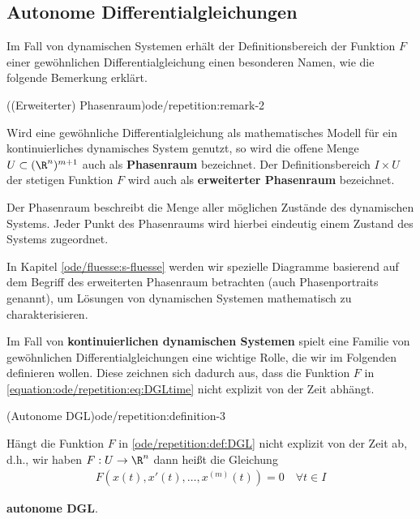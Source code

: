 \documentclass[letterpaper,10pt,german]{jupyterBook}
\begin{document}
\subsection{Autonome Differentialgleichungen}
\label{\detokenize{ode/repetition:autonome-differentialgleichungen}}
\par
Im Fall von dynamischen Systemen erhält der Definitionsbereich der Funktion \(F\) einer gewöhnlichen Differentialgleichung einen besonderen Namen, wie die folgende Bemerkung erklärt.
\begin{remark}{((Erweiterter) Phasenraum)}{ode/repetition:remark-2}



\par
Wird eine gewöhnliche Differentialgleichung als mathematisches Modell für ein kontinuierliches dynamisches System genutzt, so wird die offene Menge \(U\subset (\R^n)^{m+1}\) auch als \textbf{Phasenraum} bezeichnet.
Der Definitionsbereich \(I\times U\) der stetigen Funktion \(F\) wird auch als \textbf{erweiterter Phasenraum} bezeichnet.

\par
Der Phasenraum beschreibt die Menge aller möglichen Zustände des dynamischen Systems.
Jeder Punkt des Phasenraums wird hierbei eindeutig einem Zustand des Systems zugeordnet.

\par
In Kapitel \cref{ode/fluesse:s-fluesse}  werden wir spezielle Diagramme basierend auf dem Begriff des erweiterten Phasenraum betrachten (auch Phasenportraits genannt), um Lösungen von dynamischen Systemen mathematisch zu charakterisieren.
\end{remark}

\par
Im Fall von \textbf{kontinuierlichen dynamischen Systemen} spielt eine Familie von gewöhnlichen Differentialgleichungen eine wichtige Rolle, die wir im Folgenden definieren wollen.
Diese zeichnen sich dadurch aus, dass die Funktion \(F\) in \eqref{equation:ode/repetition:eq:DGLtime} nicht explizit von der Zeit abhängt.
\begin{definition}{(Autonome DGL)}{ode/repetition:definition-3}



\par
Hängt die Funktion \(F\) in \cref{ode/repetition:def:DGL} nicht explizit von der Zeit ab, d.h., wir haben \(F:U\rightarrow\R^n\) dann heißt die Gleichung
\begin{align}\label{equation:ode/repetition:eq:autonomeDGL}
F(x(t), x'(t), \ldots, x^{(m)}(t)) = 0 \quad \forall t\in I
\end{align}
\par
\textbf{autonome DGL}.
\end{definition}
\end{document}

